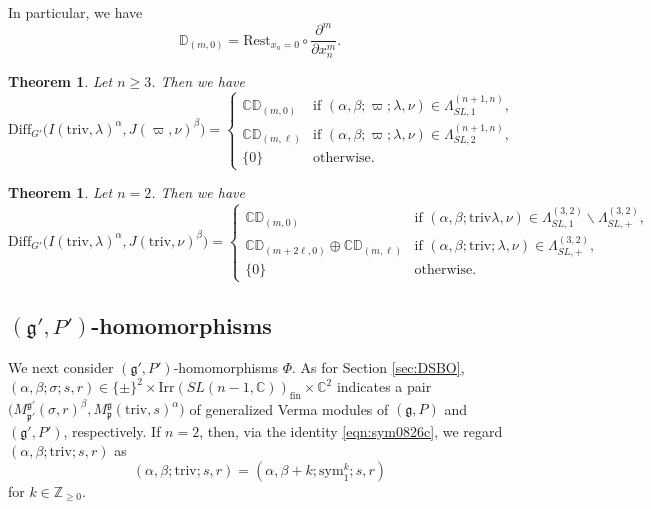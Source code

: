 \documentclass[reqno,11pt]{amsart}
\newtheorem{thm}[equation]{Theorem}
\theoremstyle{remark}
\theoremstyle{definition}
\numberwithin{equation}{section}
\newcommand{\gb}{\beta}
\newcommand{\ga}{\alpha}
\newcommand{\gL}{\Lambda}
\newcommand{\fg}{{\mathfrak g}}
\newcommand{\fp}{{\mathfrak p}}
\newcommand{\C}{\mathbb{C}}
\newcommand{\Z}{\mathbb{Z}}
\newcommand{\Diff}{\mathrm{Diff}}
\newcommand{\Irr}{\mathrm{Irr}}
\newcommand{\triv}{\mathrm{triv}}
\newcommand{\fin}{\mathrm{fin}}
\newcommand{\sym}{\mathrm{sym}}
\newcommand{\Mp}{M^{\fg}_{\fp}}
\newcommand{\Mpp}{M^{\fg'}_{\fp'}}
\newcommand{\Rest}{\mathrm{Rest}}
\newcommand{\bD}{\mathbb{D}}
\begin{document}
\noindent
In particular, we have
\begin{equation*}
\bD_{(m,0)} = \Rest_{x_n=0} \circ \frac{\partial^m}{\partial x_n^m}.
\end{equation*}

\begin{thm}\label{thm:DSBO2a}
Let $n\geq 3$. Then we have
\begin{equation*}
\Diff_{G'}\big(I(\triv, \lambda)^{\alpha}, J(\varpi, \nu)^{\beta}\big)
=
\begin{cases}
\C\bD_{(m,0)} 
& \text{if $(\alpha, \beta;\varpi; \lambda, \nu)\in \Lambda^{(n+1,n)}_{SL,1}$,}\\[3pt]
\C \bD_{(m,\ell)} 
& \text{if $(\alpha, \beta;\varpi; \lambda, \nu)\in \Lambda^{(n+1,n)}_{SL,2}$,}\\
\{0\} & \text{otherwise.}
\end{cases}
\end{equation*}
\end{thm}

\begin{thm}\label{thm:DSBO2b}
Let $n=2$. Then we have
\begin{equation*}
\Diff_{G'}\big(I(\triv, \lambda)^{\alpha}, J(\triv, \nu)^{\beta}\big)
=
\begin{cases}
\C\bD_{(m,0)} 
& \text{if $(\alpha, \beta;\triv \lambda, \nu) 
\in 
\gL^{(3,2)}_{SL,1}\backslash \gL^{(3,2)}_{SL,+}$,}\\[3pt]
\C \bD_{(m+2\ell,0)} \oplus \C \bD_{(m, \ell)}
& \text{if $(\alpha, \beta;\triv; \lambda, \nu)\in 
\gL^{(3,2)}_{SL,+}$,}\\
\{0\} & \text{otherwise.}
\end{cases}
\end{equation*}

\end{thm}

\subsection{$(\fg', P')$-homomorphisms}

We next consider $(\fg', P')$-homomorphisms $\Phi$.
As for Section \ref{sec:DSBO}, 
$(\alpha,\beta; \sigma; s, r) \in 
\{\pm\}^2\times \Irr(SL(n-1,\C))_{\fin} \times \C^2$ indicates
a pair $(\Mpp(\sigma,r)^\gb, \Mp(\triv, s)^\ga\big)$ of generalized Verma modules
of $(\fg, P)$ and $(\fg',P')$, respectively.
If $n=2$, then, via the identity \eqref{eqn:sym0826c}, we regard
$(\ga,\gb;\triv;s,r)$ as 
\begin{equation}\label{eqn:sym0826d}
(\ga,\gb;\triv;s,r) = (\ga,\gb+k;\sym^k_1;s,r)
\end{equation}
for $k \in \Z_{\geq 0}$. 
\end{document}
